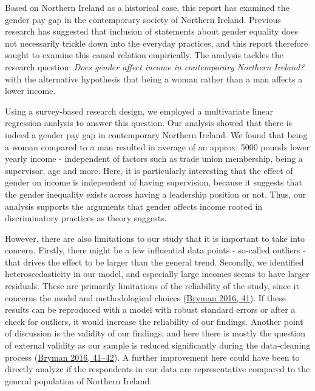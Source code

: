 \documentclass[
]{article}
\begin{document}
Based on Northern Ireland as a historical case, this report has examined
the gender pay gap in the contemporary society of Northern Ireland.
Previous research has suggested that inclusion of statements about
gender equality does not necessarily trickle down into the everyday
practices, and this report therefore sought to examine this causal
relation empirically. The analysis tackles the research question:
\emph{Does gender affect income in contemporary Northern Ireland?} with
the alternative hypothesis that being a woman rather than a man affects
a lower income.

Using a survey-based research design, we employed a multivariate linear
regression analysis to answer this question. Our analysis showed that
there is indeed a gender pay gap in contemporary Northern Ireland. We
found that being a woman compared to a man resulted in average of an
approx. 5000 pounds lower yearly income - independent of factors such as
trade union membership, being a supervisor, age and more. Here, it is
particularly interesting that the effect of gender on income is
independent of having supervision, because it suggests that the gender
inequality exists across having a leadership position or not. Thus, our
analysis supports the arguments that gender affects income rooted in
discriminatory practices as theory suggests.

However, there are also limitations to our study that it is important to
take into concern. Firstly, there might be a few influential data points
- so-called outliers - that drives the effect to be larger than the
general trend. Secondly, we identified heteroscedasticity in our model,
and especially large incomes seems to have larger residuals. These are
primarily limitations of the reliability of the study, since it concerns
the model and methodological choices
(\protect\hyperlink{ref-bryman2016social}{Bryman 2016, 41}). If these
results can be reproduced with a model with robust standard errors or
after a check for outliers, it would increase the reliability of our
findings. Another point of discussion is the validity of our findings,
and here there is mostly the question of external validity as our sample
is reduced significantly during the data-cleaning process
(\protect\hyperlink{ref-bryman2016social}{Bryman 2016, 41--42}). A
further improvement here could have been to directly analyze if the
respondents in our data are representative compared to the general
population of Northern Ireland.

\pagebreak
\end{document}

